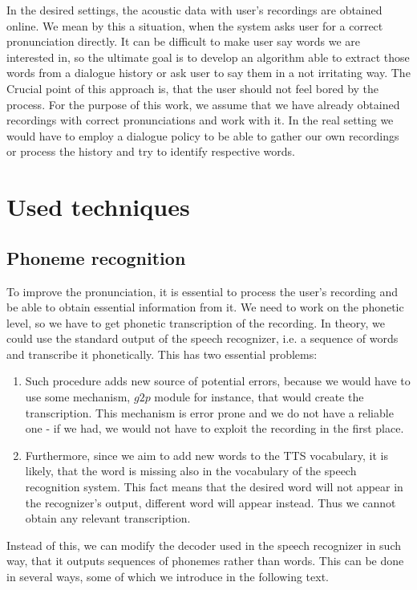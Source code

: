 In the desired settings, the acoustic data with user's recordings are obtained online.
We mean by this a situation, when the system asks user for a correct pronunciation directly.
It can be difficult to make user say words we are interested in, so the ultimate goal is to develop an algorithm able to extract those words from a dialogue history or ask user to say them in a not irritating way.
The Crucial point of this approach is, that the user should not feel bored by the process. For the purpose of this work, we assume that we have already obtained recordings with correct pronunciations and work with it.
In the real setting we would have to employ a dialogue policy to be able to gather our own recordings or process the history and try to identify respective words.
\section{Used techniques}
\subsection{Phoneme recognition}
\label{ph-rec}
To improve the pronunciation, it is essential to process the user's recording and be able to obtain essential information from it.
We need to work on the phonetic level, so we have to get phonetic transcription of the recording.
In theory, we could use the standard output of the speech recognizer, i.e. a sequence of words and transcribe it phonetically.
This has two essential problems:
\begin{enumerate}
\item Such procedure adds new source of potential errors, because we would have to use some mechanism, $g2p$ module for instance, that would create the transcription. This mechanism is error prone and we do not have a reliable one - if we had, we would not have to exploit the recording in the first place.
\item Furthermore, since we aim to add new words to the TTS vocabulary, it is likely, that the word is missing also in the vocabulary of the speech recognition system.
This fact means that the desired word will not appear in the recognizer's output, different word will appear instead.
Thus we cannot obtain any relevant transcription.
\end{enumerate}
Instead of this, we can modify the decoder used in the speech recognizer in such way, that it outputs sequences of phonemes rather than words.
This can be done in several ways, some of which we introduce in the following text.
